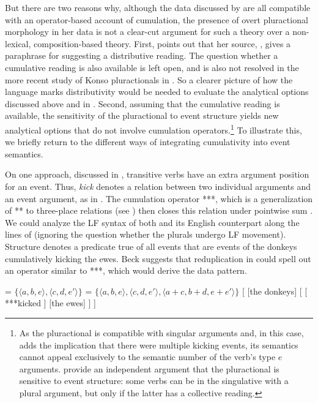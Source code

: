 \documentclass[output=paper]{langscibook}
\begin{document}
But there are two reasons why, although the data discussed by \citet{Beck:2012} are all compatible with an operator-based account of cumulation, the presence of overt pluractional morphology in her data is not a clear-cut argument for such a theory over a non-lexical, composition-based theory. First, \citet{Beck:2012} points out that her source, \citet{Ongaye:2010}, gives a paraphrase for   suggesting a distributive reading. The question whether a cumulative reading is also available is left open, and is also not resolved in the more recent study of Konso pluractionals in \citet{Ongaye:2017}. So a clearer picture of how the language marks distributivity would be needed to evaluate the analytical options discussed above and in \citet{Beck:2012}. Second, assuming that the cumulative reading is available, the sensitivity of the pluractional to event structure yields new analytical options that do not involve cumulation operators.\footnote{As the pluractional is compatible with singular arguments  and, in this case, adds the implication that there were multiple kicking events, its semantics cannot appeal exclusively to the semantic number of the verb's type $e$ arguments. \citet{Ongaye:2017} provide an independent argument that the pluractional is sensitive to event structure: some verbs can be in the singulative with a plural argument, but only if the latter has a collective reading.} To illustrate this, we briefly return to the different ways of integrating cumulativity into event semantics.

On one approach, discussed in \citet{Beck:2012}, transitive verbs have an extra argument position for an event. Thus, \textit{kick} denotes a relation between two individual arguments and an event argument, as in . The cumulation operator ***, which is a generalization of ** to three-place relations (see \citealt{Sternefeld:1998, Vaillette:2001}) then closes this relation under pointwise sum . We could analyze the LF syntax of both  and its English counterpart along the lines of  (ignoring the question whether the plurals undergo LF movement). Structure  denotes a predicate true of all events that are events of the donkeys cumulatively kicking the ewes. Beck suggests that reduplication in  could spell out an operator similar to ***, which would derive the data pattern.

\ea \label{has-sch:17}
\ea \label{has-sch:17a} = $\{\langle a, b, e\rangle, \langle c, d, e'\rangle\}$
\ex \label{has-sch:17b} = $\{\langle a, b, e\rangle, \langle c, d, e'\rangle, \langle a+c, b+d, e+e'\rangle\}$ 
\ex \label{has-sch:17c} [ [the donkeys] [ [ ***kicked ] [the ewes] ] ] \z\z
\end{document}
